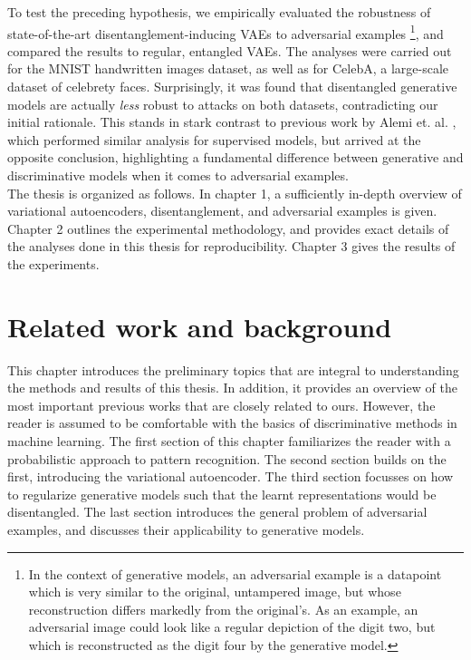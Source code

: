\documentclass{report}
\begin{document}
\noindent To test the preceding hypothesis, we empirically evaluated the robustness of state-of-the-art disentanglement-inducing VAEs to adversarial examples \footnote{In the context of generative models, an adversarial example is a datapoint which is very similar to the original, untampered image, but whose reconstruction differs markedly from the original's. As an example, an adversarial image could look like a regular depiction of the digit two, but which is reconstructed as the digit four by the generative model.}, and compared the results to regular, entangled VAEs. The analyses were carried out for the MNIST handwritten images dataset, as well as for CelebA, a large-scale dataset of celebrety faces. Surprisingly, it was found that disentangled generative models are actually \textit{less} robust to attacks on both datasets, contradicting our initial rationale. This stands in stark contrast to previous work by Alemi et. al. \cite{deep-variational-bottleneck}, which performed similar analysis for supervised models, but arrived at the opposite conclusion, highlighting a fundamental difference between generative and discriminative models when it comes to adversarial examples. \\

\noindent The thesis is organized as follows. In chapter 1, a sufficiently in-depth overview of variational autoencoders, disentanglement, and adversarial examples is given. Chapter 2 outlines the experimental methodology, and provides exact details of the analyses done in this thesis for reproducibility. Chapter 3 gives the results of the experiments. 

\chapter{Related work and background}

This chapter introduces the preliminary topics that are integral to understanding the methods and results of this thesis. In addition, it provides an overview of the most important previous works that are closely related to ours. However, the reader is assumed to be comfortable with the basics of discriminative methods in machine learning. The first section of this chapter familiarizes the reader with a probabilistic approach to pattern recognition. The second section builds on the first, introducing the variational autoencoder. The third section focusses on how to regularize generative models such that the learnt representations would be disentangled. The last section introduces the general problem of adversarial examples, and discusses their applicability to generative models.
\end{document}
